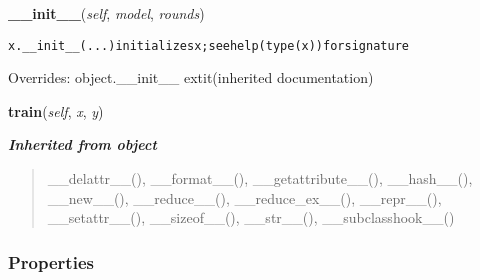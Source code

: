    \vspace{0.5ex}

\hspace{.8\funcindent}\begin{boxedminipage}{\funcwidth}

    \raggedright \textbf{\_\_init\_\_}(\textit{self}, \textit{model}, \textit{rounds})

\setlength{\parskip}{2ex}
\begin{alltt}
x.\_\_init\_\_(...) initializes x; see help(type(x)) for signature
\end{alltt}

\setlength{\parskip}{1ex}
      Overrides: object.\_\_init\_\_ 	extit{(inherited documentation)}

    \end{boxedminipage}

    \label{hal:ml:predict:BasePrediction:train}

    \vspace{0.5ex}

\hspace{.8\funcindent}\begin{boxedminipage}{\funcwidth}

    \raggedright \textbf{train}(\textit{self}, \textit{x}, \textit{y})

\setlength{\parskip}{2ex}
\setlength{\parskip}{1ex}
    \end{boxedminipage}


\large{\textbf{\textit{Inherited from object}}}

\begin{quote}
\_\_delattr\_\_(), \_\_format\_\_(), \_\_getattribute\_\_(), \_\_hash\_\_(), \_\_new\_\_(), \_\_reduce\_\_(), \_\_reduce\_ex\_\_(), \_\_repr\_\_(), \_\_setattr\_\_(), \_\_sizeof\_\_(), \_\_str\_\_(), \_\_subclasshook\_\_()
\end{quote}


  \subsubsection{Properties}

